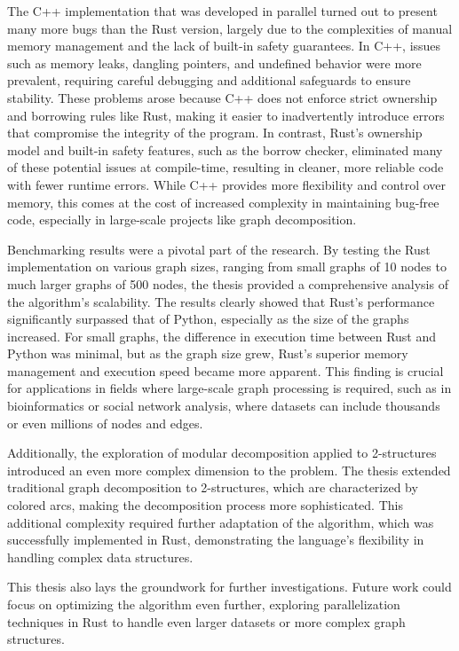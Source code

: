 The C++ implementation that was developed in parallel turned out to present many more bugs than the Rust version, largely due to the complexities of manual memory management and the lack of built-in safety guarantees.
In C++, issues such as memory leaks, dangling pointers, and undefined behavior were more prevalent, requiring careful debugging and additional safeguards to ensure stability.
These problems arose because C++ does not enforce strict ownership and borrowing rules like Rust, making it easier to inadvertently introduce errors that compromise the integrity of the program.
In contrast, Rust’s ownership model and built-in safety features, such as the borrow checker, eliminated many of these potential issues at compile-time, resulting in cleaner, more reliable code with fewer runtime errors.
While C++ provides more flexibility and control over memory, this comes at the cost of increased complexity in maintaining bug-free code, especially in large-scale projects like graph decomposition.

Benchmarking results were a pivotal part of the research.
By testing the Rust implementation on various graph sizes, ranging from small graphs of 10 nodes to much larger graphs of 500 nodes, the thesis provided a comprehensive analysis of the algorithm’s scalability.
The results clearly showed that Rust’s performance significantly surpassed that of Python, especially as the size of the graphs increased.
For small graphs, the difference in execution time between Rust and Python was minimal, but as the graph size grew, Rust’s superior memory management and execution speed became more apparent.
This finding is crucial for applications in fields where large-scale graph processing is required, such as in bioinformatics or social network analysis, where datasets can include thousands or even millions of nodes and edges.

Additionally, the exploration of modular decomposition applied to 2-structures introduced an even more complex dimension to the problem.
The thesis extended traditional graph decomposition to 2-structures, which are characterized by colored arcs, making the decomposition process more sophisticated.
This additional complexity required further adaptation of the algorithm, which was successfully implemented in Rust, demonstrating the language's flexibility in handling complex data structures.

This thesis also lays the groundwork for further investigations.
Future work could focus on optimizing the algorithm even further, exploring parallelization techniques in Rust to handle even larger datasets or more complex graph structures.

